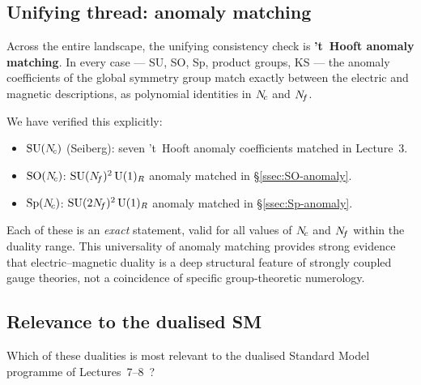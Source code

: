 \documentclass[11pt,a4paper]{article}
\newcommand{\SO}[1]{\mathrm{SO}(#1)}
\newcommand{\Sp}[1]{\mathrm{Sp}(#1)}
\begin{document}
\subsection{Unifying thread: anomaly matching}

Across the entire landscape, the unifying consistency check is
\textbf{'t~Hooft anomaly matching}.  In every case --- SU, SO, Sp,
product groups, KS --- the anomaly coefficients of the global
symmetry group match exactly between the electric and magnetic
descriptions, as polynomial identities in $N_{\!c}$ and $N_{\!f}$.

We have verified this explicitly:
\begin{itemize}
  \item $\mathrm{SU}(N_{\!c})$ (Seiberg): seven 't~Hooft anomaly coefficients
    matched in Lecture~3.
  \item $\SO{\Nc}$: $\mathrm{SU}(N_{\!f})^2\,\mathrm{U}(1)_R$ anomaly matched in
    \S\ref{ssec:SO-anomaly}.
  \item $\Sp{\Nc}$: $\mathrm{SU}(2N_{\!f})^2\,\mathrm{U}(1)_R$ anomaly matched in
    \S\ref{ssec:Sp-anomaly}.
\end{itemize}

Each of these is an \emph{exact} statement, valid for all values of
$N_{\!c}$ and $N_{\!f}$ within the duality range.  This universality of
anomaly matching provides strong evidence that electric--magnetic
duality is a deep structural feature of strongly coupled gauge
theories, not a coincidence of specific group-theoretic numerology.

\subsection{Relevance to the dualised SM}

Which of these dualities is most relevant to the dualised Standard
Model programme of Lectures~7--8~\cite{CacciapagliaSannino2024}?
\end{document}
